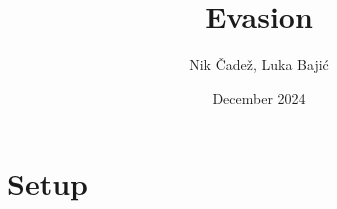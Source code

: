 \documentclass{article}
\title{Evasion}
\author{Nik Čadež, Luka Bajić}
\date{December 2024}
\begin{document}
\maketitle

\section{Setup}
\end{document}
